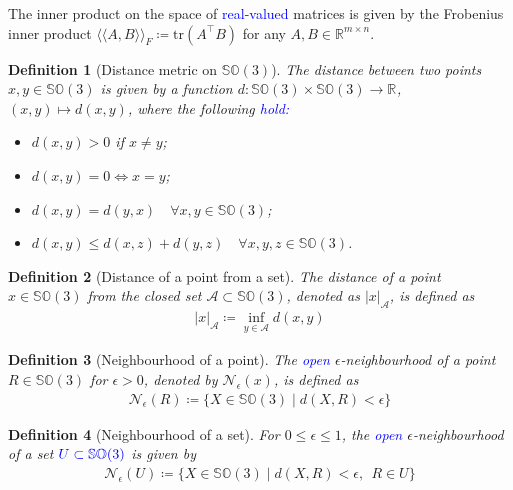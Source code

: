 \documentclass{article}
\newcommand{\SOthree}{\mathbb{SO}(3)}
\newcommand{\R}[1]{\mathbb{R}^{#1}}
\newtheorem{definition}{Definition}
\newcommand{\trace}[1]{\text{tr}\left(#1\right)}
\newcommand{\textblue}[1]{\textcolor{blue}{#1}}
\newcommand{\frobenius}[2]{\langle\langle #1, #2\rangle\rangle_F}
\newcommand{\A}{\mathcal{A}}
\newcommand{\distfromA}[1]{|#1|_\A}
\newcommand{\neighbourhood}[2]{\mathcal{N}_{#1}(#2)}
\begin{document}
The inner product on the space of \textblue{real-valued} matrices is given by the Frobenius inner product $\frobenius{A}{B}\coloneqq \trace{{A^\top B}}$ for any $A, B\in\R{m\times n}$.

\begin{definition}[Distance metric on $\SOthree$]\label{def:dist_metric}
The distance between two points $x,y\in\SOthree$ is given by a function $d: \SOthree\times\SOthree\to \R{}$, $(x,y)\mapsto d(x,y)$, where the following \textblue{hold:}
\begin{itemize}
    \item $d(x,y) > 0$ if $x \neq y$;
    \item $d(x,y) = 0 \Leftrightarrow x = y$;
    \item $d(x, y) = d(y,x) \quad \forall x, y\in\SOthree$;
    \item $d(x,y) \leq d(x,z) + d(y,z) \quad {\forall x, y, z\in \SOthree}$.
\end{itemize}
\end{definition}

\begin{definition}[Distance of a point from a set]
The distance of a point $x\in \SOthree$ from the closed set $\A \subset \SOthree$, denoted as $|x|_\A$, is defined as 
\begin{align*}
    \distfromA{x} \coloneqq \inf_{y\in \A} d(x,y)
\end{align*}
\end{definition}

\begin{definition}[Neighbourhood of a point]
    The \textblue{open} $\epsilon$-neighbourhood of a point $R\in \SOthree$ for $\epsilon > 0$, denoted by $\neighbourhood{\epsilon}{x}$, is defined as 
    \begin{align*}
        \neighbourhood{\epsilon}{R} \coloneqq \{X\in \SOthree \mid d(X, R) < \epsilon\}
    \end{align*}
\end{definition}

\begin{definition}[Neighbourhood of a set]
    For $0 \leq \epsilon \leq 1$, the \textblue{open} $\epsilon$-neighbourhood of a set $\textblue{U\subset\SOthree}$ is given by 
    \begin{align*}
        \neighbourhood{\epsilon}{U} \coloneqq \{X\in\SOthree \mid d(X, R) < \epsilon,\:\:  R\in U\}
    \end{align*}
\end{definition}
\end{document}
